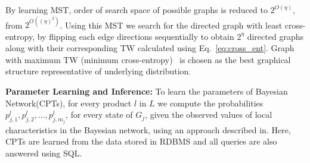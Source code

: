 By learning MST, order of search space of possible graphs is reduced to $2^{O(\eta)}$, from $2^{O((\eta)^2)}$. Using this MST we search for the directed graph with least cross-entropy, by flipping each edge directions sequentially to obtain $2^{\eta}$ directed graphs along with their corresponding TW calculated using Eq.~\ref{eq:cross_ent}. Graph with maximum TW (minimum cross-entropy)~\cite{lam1994learning} is chosen as the best graphical structure representative of underlying distribution.

\textbf{Parameter Learning and Inference:} To learn the parameters of Bayesian Network(CPTs), for every product $l$ in $L$ we compute the probabilities $p^l_{j,1}, p^l_{j,2},..., p^l_{j,m_j}$, for every state of $G_j$, given the observed values of local characteristics in the Bayesian network, using an approach described in\cite{yadav2015business}. Here, CPTs are learned from the data stored in RDBMS and all queries are also answered using SQL.